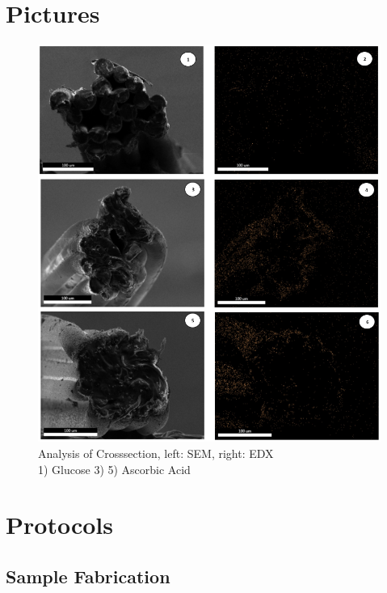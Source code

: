 \begin{appendices}
\label{sec:Appendix}


\section{Pictures}
\label{appendix:fig}

 \begin{figure}[H]
	\centerline{\includegraphics[width=\textwidth]{./pic/SEMAppendix.png}}
	\begin{center}
		\caption{\label{SEMAppendix} Analysis of Crosssection, left: SEM, right: EDX\\
			1) Glucose 3)  5) Ascorbic Acid}
	\end{center}

\end{figure}


\section{Protocols}
\label{App:Protocols}

\subsection{Sample Fabrication}


\end{appendices}
